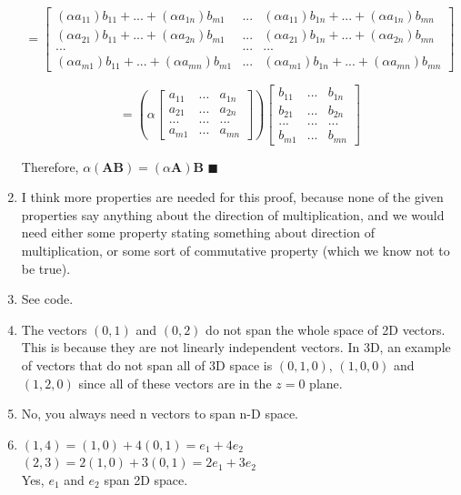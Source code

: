 \documentclass{article}
\newcommand*{\QED}{\hfill\ensuremath{\blacksquare}}
\begin{document}
\begin{enumerate}
		$$ = \begin{bmatrix}
		(\alpha a_{11}) b_{11} + ... + (\alpha a_{1n}) b_{m1} & ... & (\alpha a_{11}) b_{1n} + ... + (\alpha a_{1n}) b_{mn} \\
		(\alpha a_{21}) b_{11} + ... + (\alpha a_{2n}) b_{m1} & ... & (\alpha a_{21}) b_{1n} + ... + (\alpha a_{2n}) b_{mn} \\
		...       &      ...      &      ...      \\
		(\alpha a_{m1}) b_{11} + ... + (\alpha a_{mn}) b_{m1}  & ... & (\alpha a_{m1}) b_{1n} + ... + (\alpha a_{mn}) b_{mn}
		\end{bmatrix} $$
		
		$$= \left( \alpha\begin{bmatrix}
		a_{11}  &  ... & a_{1n} \\
		a_{21}  &  ... & a_{2n} \\
		...     &  ... & ...    \\
		a_{m1}  &  ... & a_{mn} 
		\end{bmatrix}\right) \begin{bmatrix}
		b_{11}  &  ... & b_{1n} \\
		b_{21}  &  ... & b_{2n} \\
		...     &  ... & ...    \\
		b_{m1}  &  ... & b_{mn}
		\end{bmatrix} $$
		
		Therefore, $ \alpha (\textbf{AB}) = (\alpha\textbf{A})\textbf{B} $ \QED 
		
	\item I think more properties are needed for this proof, because none of the given properties say anything about the direction of multiplication, and we would need either some property stating something about direction of multiplication, or some sort of commutative property (which we know not to be true). 
	
	\item See code.
	
	\item The vectors $(0,1)$ and $(0,2)$ do not span the whole space of 2D vectors. This is because they are not linearly independent vectors. In 3D, an example of vectors that do not span all of 3D space is $(0,1,0)$, $(1,0,0)$ and $(1,2,0)$ since all of these vectors are in the $z=0$ plane. 
	
	\item No, you always need n vectors to span n-D space. 
	
	\item $(1,4) = (1,0) + 4(0,1) = e_1 + 4e_2$\\
	$(2,3) = 2(1,0) + 3(0,1) = 2e_1 + 3e_2$\\
	Yes, $e_1$ and $e_2$ span 2D space. 
	

\end{enumerate}
\end{document}

